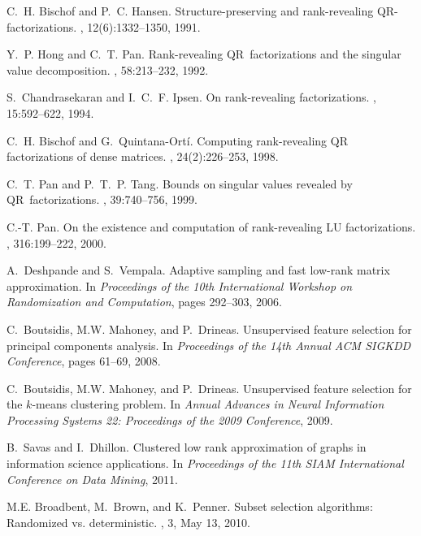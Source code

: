 \documentclass[twoside]{article}
\begin{document}
\begin{small}
\begin{thebibliography}{100}
C.~H. Bischof and P.~C. Hansen.
\newblock Structure-preserving and rank-revealing {QR}-factorizations.
,
  12(6):1332--1350, 1991.

Y.~P. Hong and C.~T. Pan.
\newblock Rank-revealing {QR}~factorizations and the singular value
  decomposition.
, 58:213--232, 1992.

S.~Chandrasekaran and I.~C.~F. Ipsen.
\newblock On rank-revealing factorizations.
, 15:592--622,
  1994.

C.~H. Bischof and G.~Quintana-Ort{\'i}.
\newblock Computing rank-revealing {QR} factorizations of dense matrices.
, 24(2):226--253,
  1998.

C.~T. Pan and P.~T.~P. Tang.
\newblock Bounds on singular values revealed by {QR}~factorizations.
, 39:740--756, 1999.

C.-T. Pan.
\newblock On the existence and computation of rank-revealing {LU}
  factorizations.
, 316:199--222, 2000.

A.~Deshpande and S.~Vempala.
\newblock Adaptive sampling and fast low-rank matrix approximation.
\newblock In {\em Proceedings of the 10th International Workshop on
  Randomization and Computation}, pages 292--303, 2006.

C.~Boutsidis, M.W. Mahoney, and P.~Drineas.
\newblock Unsupervised feature selection for principal components analysis.
\newblock In {\em Proceedings of the 14th Annual ACM SIGKDD Conference}, pages
  61--69, 2008.

C.~Boutsidis, M.W. Mahoney, and P.~Drineas.
\newblock Unsupervised feature selection for the $k$-means clustering problem.
\newblock In {\em Annual Advances in Neural Information Processing Systems 22:
  Proceedings of the 2009 Conference}, 2009.

B.~Savas and I.~Dhillon.
\newblock Clustered low rank approximation of graphs in information science
  applications.
\newblock In {\em Proceedings of the 11th SIAM International Conference on Data
  Mining}, 2011.

M.E. Broadbent, M.~Brown, and K.~Penner.
\newblock Subset selection algorithms: Randomized vs. deterministic.
, 3, May 13, 2010.


\end{thebibliography}
\end{small}
\end{document}
